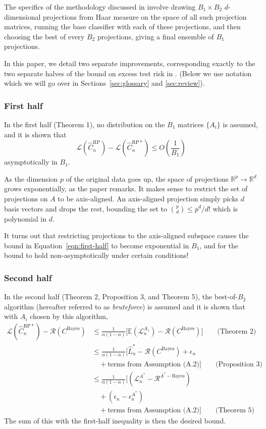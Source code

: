 \documentclass[ejs,preprint]{imsart}
\newcommand\E{\mathbb{E}}
\newcommand\cbayes{C^{\mathrm{Bayes}}}
\newcommand\crpnhat{\hat{C}_{n}^{\mathrm{RP}}}
\newcommand\crpnhatstar{\hat{C}_{n}^{\mathrm{RP*}}}
\newcommand\risk{\mathcal{L}}
\newcommand\rrisk{\mathcal{R}}
\begin{document}
The specifics of the methodology discussed in \cite{CS15} involve drawing $B_{1}\times B_{2}$ $d$-dimensional projections from Haar measure on the space of all such projection matrices, running the base classifier with each of these projections, and then choosing the best of every $B_{2}$ projections, giving a final ensemble of $B_{1}$ projections.

In this paper, we detail two separate improvements, corresponding exactly to the two separate halves of the bound on excess test risk in \cite{CS15}. (Below we use notation which we will go over in Sections~\ref{sec:glossary} and \ref{sec:review}).

\subsubsection{First half}

In the first half (Theorem 1), no distribution on the $B_1$ matrices $\{A_i\}$ is assumed, and it is shown that
\begin{equation}
\risk(\crpnhat) - \risk(\crpnhatstar) \leq O\left(\frac{1}{B_1}\right)
\label{eqn:first-half}
\end{equation}
asymptotically in $B_1$.

As the dimension $p$ of the original data goes up, the space of projections $\mathbb{R}^p\to\mathbb{R}^d$ grows exponentially, as the paper remarks.
It makes sense to restrict the set of projections on $A$ to be axis-aligned. An axis-aligned projection simply picks $d$ basis vectors and drops the rest, bounding the set to $\binom{p}{d}\leq p^{d}/d!$ which is polynomial in $d$.

It turns out that restricting projections to the axis-aligned subspace causes the bound in Equation~\ref{eqn:first-half} to become exponential in $B_1$, and for the bound to hold non-asymptotically under certain conditions!

\subsubsection{Second half}

In the second half (Theorem 2, Proposition 3, and Theorem 5), the best-of-$B_2$ algorithm (hereafter referred to as \textit{bruteforce}) is assumed and it is shown that with $A_i$ chosen by this algorithm, 
\begin{align*}
\risk(\crpnhatstar) - \rrisk(\cbayes)
	&\leq \frac1{\alpha(1-\alpha)}\big[
			\E(\risk_n^{A_1})-\rrisk(\cbayes)
		\big] \qquad\text{(Theorem 2)} \\
	&\leq \frac1{\alpha(1-\alpha)}\big[
			\hat{L}_n^* - \rrisk(\cbayes) + \epsilon_n \\
	&\quad	+ \text{terms from Assumption (A.2)}
		\big] \qquad\text{(Proposition 3)} \\
	&\leq \frac1{\alpha(1-\alpha)}\big[
			(\risk_n^{A^*} - \rrisk^{A^*-\mathrm{Bayes}}) \\
	&\quad	+ (\epsilon_n - \epsilon_n^{A^*}) \\
	&\quad	+ \text{terms from Assumption (A.2)}
		\big] \qquad\text{(Theorem 5)}
\end{align*}
The sum of this with the first-half inequality is then the desired bound.
\end{document}
